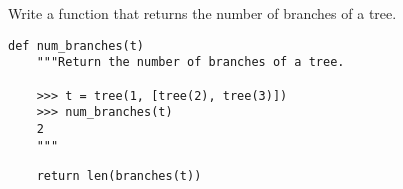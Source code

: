 \question Write a function that returns the number of branches of a tree.

\begin{lstlisting}
def num_branches(t)
    """Return the number of branches of a tree.

    >>> t = tree(1, [tree(2), tree(3)])
    >>> num_branches(t)
    2
    """
\end{lstlisting}
\begin{solution}[.5in]
\begin{lstlisting}
    return len(branches(t))
\end{lstlisting}
\end{solution}
